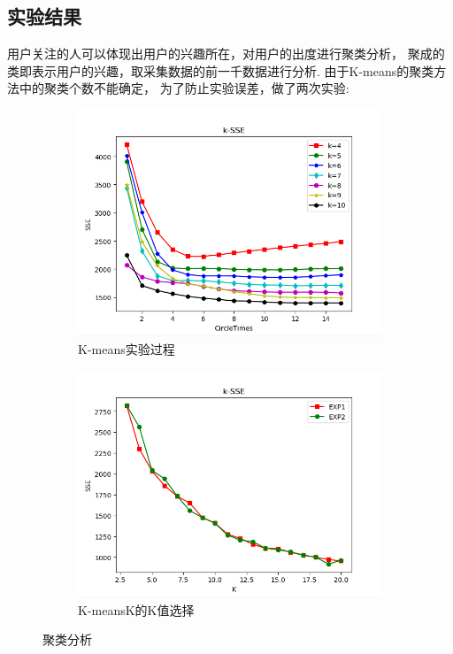 \documentclass[bachelor,adobefonts]{jnuthesis}
\begin{document}
\subsection{实验结果}
用户关注的人可以体现出用户的兴趣所在，对用户的出度进行聚类分析，
聚成的类即表示用户的兴趣，取采集数据的前一千数据进行分析.
由于K-means的聚类方法中的聚类个数不能确定，
为了防止实验误差，做了两次实验:
\begin{figure}[h!]
  \centering
  \begin{subfigure}[b]{0.49\linewidth}
    \includegraphics[width=\linewidth]{diedaigoucheng.png}
    \caption{K-means实验过程}
  \end{subfigure}
  \begin{subfigure}[b]{0.49\linewidth}
    \includegraphics[width=\linewidth]{Kzhiduibi.png}
    \caption{K-meansK的K值选择}
  \end{subfigure}
  \caption{聚类分析}
\end{figure}
\end{document}
